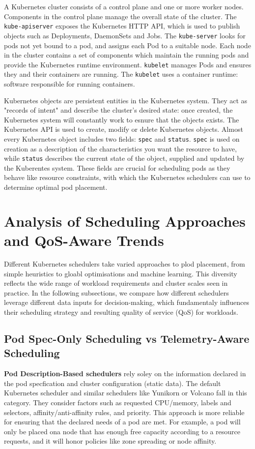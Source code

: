 A Kubernetes cluster consists of a control plane and one or more worker nodes.
Components in the control plane manage the overall state of the cluster. The
\verb|kube-apiserver| exposes the Kubernetes HTTP API, which is used to publish
objects such as Deployments, DaemonSets and Jobs. The \verb|kube-server| looks
for pods not yet bound to a pod, and assigns each Pod to a suitable node. Each
node in the cluster contains a set of components which maintain the running pods
and provide the Kubernetes runtime environment. \verb|kubelet| manages Pods and
ensures they and their containers are running. The \verb|kubelet| uses a
container runtime: software responsible for running containers.

Kubernetes objects are persistent entities in the Kubernetes system. They act as
"records of intent" and describe the cluster's desired state: once created, the
Kubernetes system will constantly work to esnure that the objects exists. The
Kubernetes API is used to create, modify or delete Kubernetes objects. Almost
every Kubernetes object includes two fields: \verb|spec| and \verb|status|.
\verb|spec| is used on creation as a description of the characteristics you want
the resource to have, while \verb|status| describes the current state of the
object, supplied and updated by the Kuberentes system. These fields are crucial
for scheduling pods as they behave like resource constraints, with which the
Kubernetes schedulers can use to determine optimal pod placement.

\section{Analysis of Scheduling Approaches and QoS-Aware Trends}
Different Kubernetes schedulers take varied approaches to plod placement, from
simple heuristics to gloabl optimisations and machine learning. This diversity
reflects the wide range of workload requirements and cluster scales seen in
practice. In the following subsections, we compare how different schedulers
leverage different data inputs for decision-making, which fundamentaly
influences their scheduling strategy and resulting quality of service (QoS) for
workloads.

\subsection{Pod Spec-Only Scheduling vs Telemetry-Aware Scheduling}

\textbf{Pod Description-Based schedulers} rely soley on the information declared
in the pod specfication and cluster configuration (static data). The default
Kubernetes scheduler \cite{} and similar schedulers like Yunikorn or Volcano
\cite{} fall in this category. They consider factors such as requested
CPU/memory, labels and selectors, affinity/anti-affinity rules, and priority.
This approach is more reliable for ensuring that the declared needs of a pod are
met. For example, a pod will only be placed ona  node that has enough free
capacity according to a resource requests, and it will honor policies like zone
spreading or node affinity.

